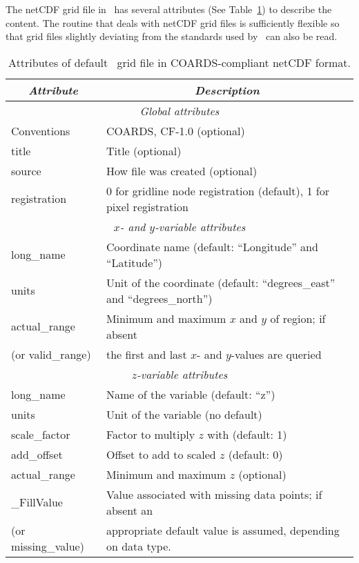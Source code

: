 The netCDF grid file in \GMT\ has several attributes (See Table~\ref{tbl:netcdf-format})
to describe the content. The routine
that deals with netCDF grid files is sufficiently flexible so that grid files slightly deviating
from the standards used by \GMT\ can also be read.

\begin{table}
\centering
\begin{tabular}{|l|l|} \hline
\multicolumn{1}{|c}{\emph{Attribute}}   &       \multicolumn{1}{|c|}{\emph{Description}}        \\ \hline
\multicolumn{2}{|c|}{\emph{Global attributes}} \\ \hline
Conventions			& COARDS, CF-1.0 (optional) \\ \hline
title				& Title (optional) \\ \hline
source				& How file was created (optional) \\ \hline
registration			& 0 for gridline node registration (default), 1 for pixel registration \\ \hline
\multicolumn{2}{|c|}{\emph{$x$- and $y$-variable attributes}} \\ \hline
long\_name			& Coordinate name (default: ``Longitude'' and ``Latitude'') \\ \hline
units				& Unit of the coordinate (default: ``degrees\_east'' and ``degrees\_north'') \\ \hline
actual\_range			& Minimum and maximum $x$ and $y$ of region; if absent \\
(or valid\_range)		& the first and last $x$- and $y$-values are queried \\ \hline
\multicolumn{2}{|c|}{\emph{$z$-variable attributes}} \\ \hline
long\_name			& Name of the variable (default: ``z'') \\ \hline
units				& Unit of the variable (no default) \\ \hline
scale\_factor			& Factor to multiply $z$ with (default: 1) \\ \hline
add\_offset			& Offset to add to scaled $z$ (default: 0) \\ \hline
actual\_range			& Minimum and maximum $z$ (optional) \\ \hline
\_FillValue			& Value associated with missing data points; if absent an\\
(or missing\_value)		& appropriate default value is assumed, depending on data type. \\ \hline
\end{tabular}
\caption{Attributes of default \gmt\ grid file in COARDS-compliant netCDF format.}
\label{tbl:netcdf-format}
\end{table}

